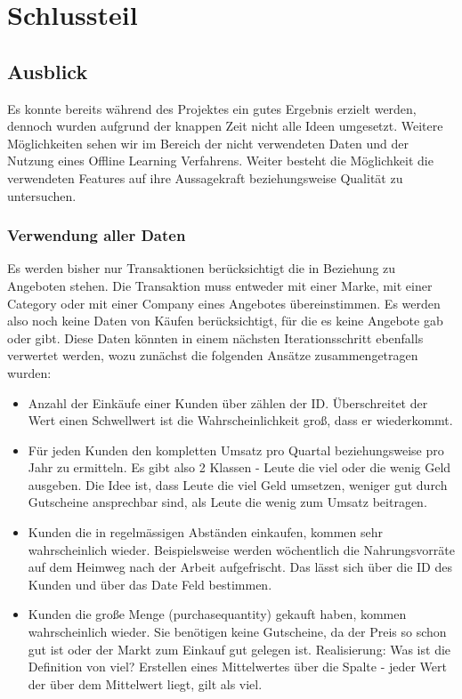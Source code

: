 \section{Schlussteil}

\subsection{Ausblick}
	Es konnte bereits während des Projektes ein gutes Ergebnis erzielt werden, dennoch wurden aufgrund der knappen Zeit nicht alle Ideen umgesetzt. Weitere Möglichkeiten sehen wir im Bereich der nicht verwendeten Daten und der Nutzung eines Offline Learning Verfahrens. Weiter besteht die Möglichkeit die verwendeten Features auf ihre Aussagekraft beziehungsweise Qualität zu untersuchen.

\subsubsection{Verwendung aller Daten}
	Es werden bisher nur Transaktionen berücksichtigt die in Beziehung zu Angeboten stehen. Die Transaktion muss entweder mit einer Marke, mit einer Category oder mit einer Company eines Angebotes übereinstimmen. Es werden also noch keine Daten von Käufen berücksichtigt, für die es keine Angebote gab oder gibt. Diese Daten könnten in einem nächsten Iterationsschritt ebenfalls verwertet werden, wozu zunächst die folgenden Ansätze zusammengetragen wurden:
	
\begin{itemize}
	\item Anzahl der Einkäufe einer Kunden über zählen der ID. Überschreitet der Wert einen Schwellwert ist die Wahrscheinlichkeit groß, dass er wiederkommt.
	\item Für jeden Kunden den kompletten Umsatz pro Quartal beziehungsweise pro Jahr zu ermitteln. Es gibt also 2 Klassen - Leute die viel oder die wenig Geld ausgeben. Die Idee ist, dass Leute die viel Geld umsetzen, weniger gut durch Gutscheine ansprechbar sind, als Leute die wenig zum Umsatz beitragen.  
	\item Kunden die in regelmässigen Abständen einkaufen, kommen sehr wahrscheinlich wieder. Beispielsweise werden wöchentlich die Nahrungsvorräte auf dem Heimweg nach der Arbeit aufgefrischt. Das lässt sich über die ID des Kunden und über das Date Feld bestimmen.
	\item Kunden die große Menge (purchasequantity) gekauft haben, kommen wahrscheinlich wieder. Sie benötigen keine Gutscheine, da der Preis so schon gut ist oder der Markt zum Einkauf gut gelegen ist. Realisierung: Was ist die Definition von viel? Erstellen eines Mittelwertes über die Spalte - jeder Wert der über dem Mittelwert liegt, gilt als viel.
\end{itemize}

